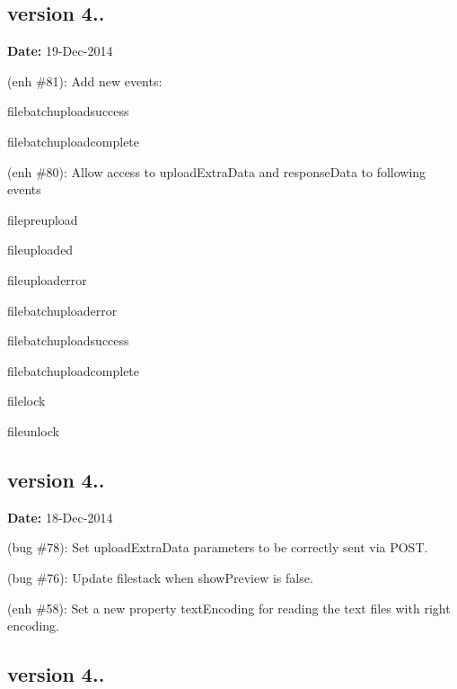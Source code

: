 \subsection*{version 4..}

{\bfseries Date\+:} 19-\/\+Dec-\/2014


\begin{DoxyItemize}
\item (enh \#81)\+: Add new events\+:
\begin{DoxyItemize}
\item {\ttfamily filebatchuploadsuccess}
\item {\ttfamily filebatchuploadcomplete}
\end{DoxyItemize}
\item (enh \#80)\+: Allow access to {\ttfamily upload\+Extra\+Data} and {\ttfamily response\+Data} to following events
\begin{DoxyItemize}
\item {\ttfamily filepreupload}
\item {\ttfamily fileuploaded}
\item {\ttfamily fileuploaderror}
\item {\ttfamily filebatchuploaderror}
\item {\ttfamily filebatchuploadsuccess}
\item {\ttfamily filebatchuploadcomplete}
\item {\ttfamily filelock}
\item {\ttfamily fileunlock}
\end{DoxyItemize}
\end{DoxyItemize}

\subsection*{version 4..}

{\bfseries Date\+:} 18-\/\+Dec-\/2014


\begin{DoxyItemize}
\item (bug \#78)\+: Set upload\+Extra\+Data parameters to be correctly sent via P\+O\+ST.
\item (bug \#76)\+: Update filestack when {\ttfamily show\+Preview} is false.
\item (enh \#58)\+: Set a new property {\ttfamily text\+Encoding} for reading the text files with right encoding.
\end{DoxyItemize}

\subsection*{version 4..}

